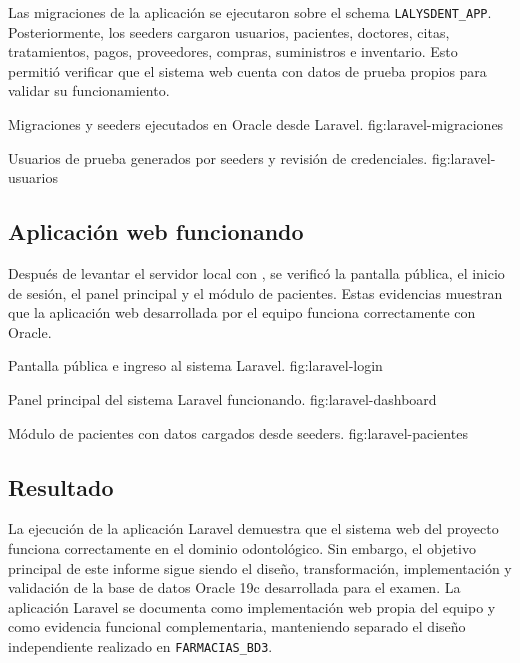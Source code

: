 Las migraciones de la aplicación se ejecutaron sobre el schema \texttt{LALYSDENT\_APP}. Posteriormente, los seeders cargaron usuarios, pacientes, doctores, citas, tratamientos, pagos, proveedores, compras, suministros e inventario. Esto permitió verificar que el sistema web cuenta con datos de prueba propios para validar su funcionamiento.

{Migraciones y seeders ejecutados en Oracle desde Laravel.}
{fig:laravel-migraciones}

{Usuarios de prueba generados por seeders y revisión de credenciales.}
{fig:laravel-usuarios}

\subsection{Aplicación web funcionando}

Después de levantar el servidor local con , se verificó la pantalla pública, el inicio de sesión, el panel principal y el módulo de pacientes. Estas evidencias muestran que la aplicación web desarrollada por el equipo funciona correctamente con Oracle.

{Pantalla pública e ingreso al sistema Laravel.}
{fig:laravel-login}

{Panel principal del sistema Laravel funcionando.}
{fig:laravel-dashboard}

{Módulo de pacientes con datos cargados desde seeders.}
{fig:laravel-pacientes}

\subsection{Resultado}

La ejecución de la aplicación Laravel demuestra que el sistema web del proyecto funciona correctamente en el dominio odontológico. Sin embargo, el objetivo principal de este informe sigue siendo el diseño, transformación, implementación y validación de la base de datos Oracle 19c desarrollada para el examen. La aplicación Laravel se documenta como implementación web propia del equipo y como evidencia funcional complementaria, manteniendo separado el diseño independiente realizado en \texttt{FARMACIAS\_BD3}.
